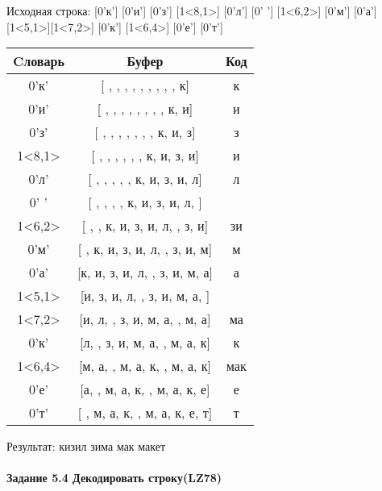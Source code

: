 \documentclass[a4paper, 12pt]{article}
\begin{document}
Исходная строка: [0'к'] [0'и'] [0'з'] [1<8,1>] [0'л'] [0' '] [1<6,2>] [0'м'] [0'а'] [1<5,1>][1<7,2>] [0'к'] [1<6,4>] [0'е'] [0'т']\\
\begin{table}[h!]
\centering
\begin{tabular}{|c|c|c|}
\hline
 Cловарь & Буфер & Код  \\ \hline
0'к' & [ ,  ,  ,  ,  ,  ,  ,  ,  , к] & к
\\ \hline
0'и' & [ ,  ,  ,  ,  ,  ,  ,  , к, и] & и
\\ \hline
0'з' & [ ,  ,  ,  ,  ,  ,  , к, и, з] & з
\\ \hline
1<8,1> & [ ,  ,  ,  ,  ,  , к, и, з, и] & и
\\ \hline
0'л' & [ ,  ,  ,  ,  , к, и, з, и, л] & л
\\ \hline
0' ' & [ ,  ,  ,  , к, и, з, и, л,  ] &  
\\ \hline
1<6,2> & [ ,  , к, и, з, и, л,  , з, и] & зи
\\ \hline
0'м' & [ , к, и, з, и, л,  , з, и, м] & м
\\ \hline
0'а' & [к, и, з, и, л,  , з, и, м, а] & а
\\ \hline
1<5,1> & [и, з, и, л,  , з, и, м, а,  ] &  
\\ \hline
1<7,2> & [и, л,  , з, и, м, а,  , м, а] & ма
\\ \hline
0'к' & [л,  , з, и, м, а,  , м, а, к] & к
\\ \hline
1<6,4> & [м, а,  , м, а, к,  , м, а, к] &  мак
\\ \hline
0'е' & [а,  , м, а, к,  , м, а, к, е] & е
\\ \hline
0'т' & [ , м, а, к,  , м, а, к, е, т] & т
\\ \hline
\end{tabular}
\end{table}

Результат: кизил зима мак макет
\pagebreak
\paragraph{Задание 5.4 Декодировать строку(LZ78)\\}
\end{document}
